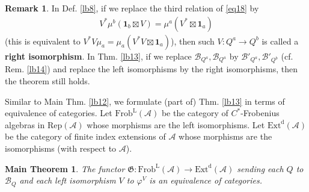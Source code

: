 \documentclass[12pt,a4paper,notitlepage]{article}
\theoremstyle{definition}
\newtheorem{rem}[df]{Remark}
\theoremstyle{plain}
\newtheorem{Mthm}{Main Theorem}
\newcommand{\fk}{\mathfrak}
\newcommand{\mc}{\mathcal}
\newcommand{\id}{\mathbf{1}}
\newcommand{\RepA}{\mathrm{Rep}(\mathcal A)}
\numberwithin{equation}{section}
\begin{document}
\begin{rem}
In Def. \ref{lb8}, if we replace the third relation of \eqref{eq18} by
\begin{align}
V^*\mu^b(\id_b\boxtimes V)=\mu^a(V^*\boxtimes\id_a)	
\end{align}
(this is equivalent to $V^*V\mu_a=\mu_a(V^*V\boxtimes\id_a)$), then such $V:Q^a\rightarrow Q^b$ is called a \textbf{right isomorphism}. In Thm. \ref{lb13}, if we replace $\mc B_{Q^a},\mc B_{Q^a}$  by $\mc B'_{Q^a},\mc B'_{Q^b}$   (cf. Rem. \ref{lb14}) and replace the left isomorphisms by the right isomorphisms, then the theorem still holds.
\end{rem}


Similar to Main Thm. \ref{lb12}, we formulate (part of) Thm. \ref{lb13} in terms of equivalence of categories. Let $\mathrm{Frob}^{\mathrm L}(\mc A)$ be the category of $C^*$-Frobenius algebras in $\RepA$ whose morphisms are the left isomorphisms. Let $\mathrm{Ext}^{\mathrm d}(\mc A)$ be the category of finite index extensions of $\mc A$ whose morphisms are the isomorphisms (with respect to $\mc A$).

\begin{Mthm}\label{lb26}
The functor $\fk G:\mathrm{Frob}^{\mathrm L}(\mc A)\rightarrow\mathrm{Ext}^{\mathrm d}(\mc A)$ sending each $Q$ to $\mc B_Q$ and each left isomorphism $V$ to $\varphi^V$ is an equivalence of categories.
\end{Mthm}
\end{document}
